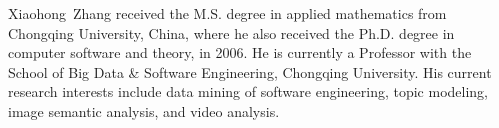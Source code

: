 \documentclass[journal]{IEEEtran}
\begin{document}
\vspace{-0.5cm}

\begin{IEEEbiography}{Xiaohong~Zhang}
    received the M.S. degree in applied mathematics from Chongqing University, China, where he also received the Ph.D. degree in computer software and theory, in 2006. He is currently a Professor with the School of Big Data \& Software Engineering, Chongqing University. His current research interests include data mining of software engineering, topic modeling, image semantic analysis, and video analysis.
\end{IEEEbiography}
\vspace{-0.5cm}








\end{document}
